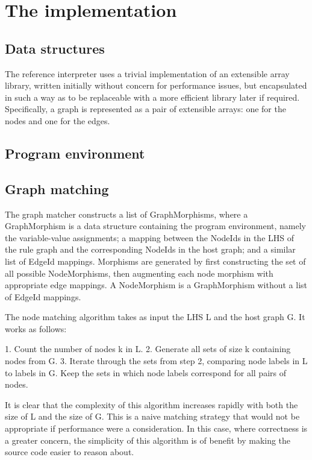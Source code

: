 
\section{The implementation}


\subsection{Data structures}

The reference interpreter uses a trivial implementation of an extensible array library, written initially without concern for performance issues, but encapsulated in such a way as to be replaceable with a more efficient library later if required. Specifically, a graph is represented as a pair of extensible arrays: one for the nodes and one for the edges.

\subsection{Program environment}

\subsection{Graph matching}

The graph matcher constructs a list of GraphMorphisms, where a GraphMorphism is a data structure containing the program environment, namely the variable-value assignments; a mapping between the NodeIds in the LHS of the rule graph and the corresponding NodeIds in the host graph; and a similar list of EdgeId mappings. Morphisms are generated by first constructing the set of all possible NodeMorphisms, then augmenting each node morphism with appropriate edge mappings. A NodeMorphism is a GraphMorphism without a list of EdgeId mappings.


The node matching algorithm takes as input the LHS L and the host graph G. It works as follows:


1. Count the number of nodes k in L.
2. Generate all sets of size k containing nodes from G.
3. Iterate through the sets from step 2, comparing node labels in L to labels in G. Keep the sets in which node labels correspond for all pairs of nodes.


It is clear that the complexity of this algorithm increases rapidly with both the size of L and the size of G. This is a naive matching strategy that would not be appropriate if performance were a consideration. In this case, where correctness is a greater concern, the simplicity of this algorithm is of benefit by making the source code easier to reason about.


